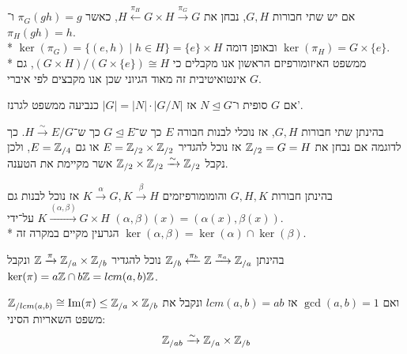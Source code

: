 \begin{example}
	אם יש שתי חבורות $G, H$, נבחן את $H \xleftarrow{\pi_H} G \times H \xrightarrow{\pi_G} G$, כאשר $\pi_G(gh) = g$ ו־$\pi_H(gh) = h$. \\*
	$\ker(\pi_G) = \{(e, h) \mid h \in H \} = \{e\} \times H$ ובאופן דומה $\ker(\pi_H) = G \times \{e \}$. \\*
	ממשפט האיזומורפיזם הראשון אנו מקבלים כי $(G \times H) / (G \times \{e\}) \cong H$, גם אינטואיטיבית זה מאוד הגיוני שכן אנו מקבצים לפי איברי $G$.
\end{example}
\begin{remark}
	אם $G$ סופית ו־$N \trianglelefteq G$ אז $|G| = |N| \cdot |G/N|$ כנביעה ממשפט לגרנז'.
\end{remark}
בהינתן שתי חבורות $G, H$, אז נוכלי לבנות חבורה $E$ כך ש־$G \trianglelefteq E$ כך ש־$H \xrightarrow{\sim} E/G$.
כך לדוגמה אם נבחן את $\mathbb{Z}_{/2} = G = H$ אז נוכל להגדיר $E = \mathbb{Z}_{/2} \times \mathbb{Z}_{/2}$ או גם $E = \mathbb{Z}_{/4}$, ולכן נקבל $\mathbb{Z}_{/2} \times \mathbb{Z}_{/2} \xrightarrow{\sim} \mathbb{Z}_{/2}$ אשר מקיימת את הטענה.

בהינתן חבורות $G, H, K$ והומומורפיזמים $K \xrightarrow{\alpha} G, K \xrightarrow{\beta} H$
אז נוכל לבנות גם $K \xrightarrow{(\alpha, \beta)} G \times H$ על־ידי $(\alpha, \beta)(x) = (\alpha(x), \beta(x))$. \\*
הגרעין מקיים במקרה זה $\ker(\alpha, \beta) = \ker(\alpha) \cap \ker(\beta)$.

בהינתן $\mathbb{Z}_{/b} \xleftarrow{\pi_b} \mathbb{Z} \xrightarrow{\pi_a} \mathbb{Z}_{/a}$ נוכל להגדיר $\mathbb{Z} \xrightarrow{\pi} \mathbb{Z}_{/a} \times \mathbb{Z}_{/b}$ ונקבל $\ker(\pi) = a\mathbb{Z} \cap b\mathbb{Z} = lcm(a, b) \mathbb{Z}$.
\begin{conclusion}
	$\mathbb{Z}_{/lcm(a, b)} \cong \operatorname{Im}(\pi) \le \mathbb{Z}_{/a} \times \mathbb{Z}_{/b}$ ואם $\gcd(a, b) = 1$ אז $lcm(a, b) = ab$ ונקבל את משפט השאריות הסיני:
	\[
		\mathbb{Z}_{/ab} \xrightarrow{\sim} \mathbb{Z}_{/a} \times \mathbb{Z}_{/b}
	\]
\end{conclusion}

